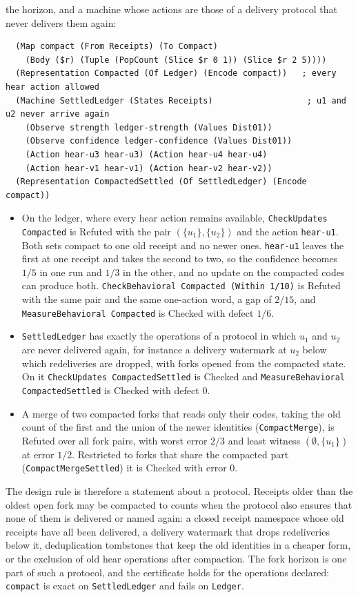 \documentclass[11pt]{article}
\newcommand{\code}[1]{\texttt{#1}}
\theoremstyle{definition}
\theoremstyle{plain}
\begin{document}
the horizon, and a machine whose actions are those of a delivery protocol that never delivers them
again:
\begin{lstlisting}
  (Map compact (From Receipts) (To Compact)
    (Body ($r) (Tuple (PopCount (Slice $r 0 1)) (Slice $r 2 5))))
  (Representation Compacted (Of Ledger) (Encode compact))   ; every hear action allowed
  (Machine SettledLedger (States Receipts)                   ; u1 and u2 never arrive again
    (Observe strength ledger-strength (Values Dist01))
    (Observe confidence ledger-confidence (Values Dist01))
    (Action hear-u3 hear-u3) (Action hear-u4 hear-u4)
    (Action hear-v1 hear-v1) (Action hear-v2 hear-v2))
  (Representation CompactedSettled (Of SettledLedger) (Encode compact))
\end{lstlisting}
\begin{itemize}
\item On the ledger, where every hear action remains available, \code{CheckUpdates Compacted} is
Refuted with the pair $(\{u_1\},\{u_2\})$ and the action \code{hear-u1}. Both sets compact to one old
receipt and no newer ones. \code{hear-u1} leaves the first at one receipt and takes the second to two,
so the confidence becomes $1/5$ in one run and $1/3$ in the other, and no update on the compacted
codes can produce both. \code{CheckBehavioral Compacted (Within 1/10)} is Refuted with the same pair
and the same one-action word, a gap of $2/15$, and \code{MeasureBehavioral Compacted} is Checked with
defect $1/6$.
\item \code{SettledLedger} has exactly the operations of a protocol in which $u_1$ and $u_2$ are never
delivered again, for instance a delivery watermark at $u_2$ below which redeliveries are dropped,
with forks opened from the compacted state. On it \code{CheckUpdates CompactedSettled} is Checked and
\code{MeasureBehavioral CompactedSettled} is Checked with defect $0$.
\item A merge of two compacted forks that reads only their codes, taking the old count of the first
and the union of the newer identities (\code{CompactMerge}), is Refuted over all fork pairs, with worst
error $2/3$ and least witness $(\emptyset,\{u_1\})$ at error $1/2$. Restricted to forks that share the
compacted part (\code{CompactMergeSettled}) it is Checked with error $0$.
\end{itemize}
The design rule is therefore a statement about a protocol. Receipts older than the oldest open fork
may be compacted to counts when the protocol also ensures that none of them is delivered or named
again: a closed receipt namespace whose old receipts have all been delivered, a delivery watermark
that drops redeliveries below it, deduplication tombstones that keep the old identities in a cheaper
form, or the exclusion of old hear operations after compaction. The fork horizon is one part of such
a protocol, and the certificate holds for the operations declared: \code{compact} is exact on
\code{SettledLedger} and fails on \code{Ledger}.
\end{document}
